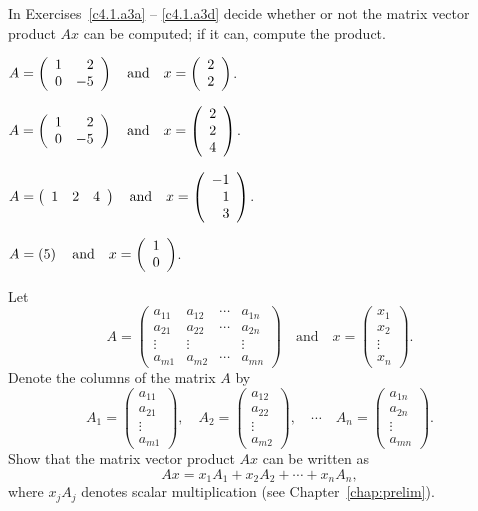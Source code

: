 \documentclass{ximera}
\begin{document}
\noindent In Exercises~\ref{c4.1.a3a} -- \ref{c4.1.a3d} decide whether or
not the matrix vector product $Ax$ can be computed; if it can, compute the
product.
\begin{exercise} \label{c4.1.a3a}
$A=\left(\begin{array}{rr} 1 & 2\\ 0 &-5\end{array}\right) \quad\mbox{and}\quad x = \left(\begin{array}{r} 2 \\ 2\end{array}\right)$.
\end{exercise}
\begin{exercise} \label{c4.1.a3b}
$A=\left(\begin{array}{rr} 1 & 2\\ 0 &-5\end{array}\right) \quad\mbox{and}\quad
x = \left(\begin{array}{r} 2\\ 2 \\4\end{array}\right)$.
\end{exercise}
\begin{exercise} \label{c4.1.a3c}
$A=\left(\begin{array}{rrr} 1 & 2 & 4 \end{array}\right) \quad\mbox{and}\quad
x = \left(\begin{array}{r} -1\\ 1 \\3\end{array}\right)$.
\end{exercise}
\begin{exercise} \label{c4.1.a3d}
$A=\left(5\right) \quad\mbox{and}\quad x = \left(\begin{array}{r} 1 \\ 0\end{array}\right)$.
\end{exercise}

\begin{exercise} \label{c4.1.b3}
Let
\[
A=\left(
\begin{array}{rrrr}
 a_{11} & a_{12} & \cdots & a_{1n} \\
 a_{21} & a_{22} & \cdots & a_{2n}  \\
 \vdots & \vdots &        & \vdots  \\
 a_{m1} & a_{m2} & \cdots & a_{mn}
\end{array}
\right)\quad\mbox{and}\quad
x =
\left( \begin{array}{r} x_1\\ x_2\\ \vdots\\ x_n\end{array}\right).
\]
Denote the columns of the matrix $A$ by
\[
A_1 =
\left(\begin{array}{c} a_{11}\\ a_{21}\\ \vdots\\
a_{m1}\end{array}\right),\quad
A_2 =
\left(\begin{array}{c} a_{12}\\ a_{22}\\ \vdots\\
a_{m2}\end{array}\right),\quad
\cdots\quad
A_n =
\left(\begin{array}{c} a_{1n}\\ a_{2n}\\ \vdots\\ a_{mn}\end{array}\right).
\]
Show that the matrix vector product $Ax$ can be written as
\[
Ax = x_1 A_1 + x_2 A_2 + \cdots + x_n A_n,
\]
where $x_j A_j$ denotes scalar multiplication (see Chapter~\ref{chap:prelim}).
\end{exercise}
\end{document}
